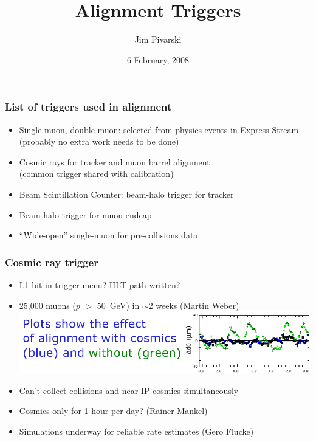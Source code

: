 \documentclass[compress]{beamer}
\title{Alignment Triggers}
\author{Jim Pivarski}
\institute{Texas A\&M University}
\date{ 6 February, 2008}
\begin{document}
\frame{\titlepage}


\begin{frame}
\frametitle{List of triggers used in alignment}
\begin{itemize}\setlength{\itemsep}{0.5 cm}
\item Single-muon, double-muon: selected from physics events in
Express Stream (probably no extra work needs to be done)

\item Cosmic rays for tracker and muon barrel alignment \\ (common
trigger shared with calibration)

\item Beam Scintillation Counter: beam-halo trigger for tracker

\item Beam-halo trigger for muon endcap

\item ``Wide-open'' single-muon for pre-collisions data
\end{itemize}
\end{frame}

\begin{frame}
\frametitle{Cosmic ray trigger}
\begin{itemize}\setlength{\itemsep}{0.5 cm}
\item L1 bit in trigger menu?  HLT path written?
\item 25,000 muons ($p$ $>$ 50~GeV) in $\sim$2 weeks (Martin Weber)
\includegraphics[width=\linewidth]{effect_of_cosmics.png}
\item Can't collect collisions and near-IP cosmics simultaneously
\item Cosmics-only for 1 hour per day? (Rainer Mankel)
\item Simulations underway for reliable rate estimates (Gero Flucke)
\end{itemize}
\end{frame}
\end{document}

